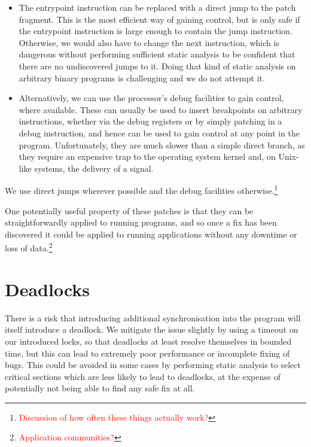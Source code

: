 \documentclass[10pt,twocolumn,preprint,natbib,authoryear]{sigplanconf}
\newcommand{\editorial}[1]{\textcolor{red}{\footnote{\textcolor{red}{#1}}}}
\begin{document}
\begin{itemize}
\item The entrypoint instruction can be replaced with a direct jump to
  the patch fragment.  This is the most efficient way of gaining
  control, but is only safe if the entrypoint instruction is large
  enough to contain the jump instruction.  Otherwise, we would also
  have to change the next instruction, which is dangerous without
  performing sufficient static analysis to be confident that there are
  no undiscovered jumps to it.  Doing that kind of static analysis on
  arbitrary binary programs is challenging and we do not attempt it.

\item Alternatively, we can use the processor's debug facilities to
  gain control, where available.  These can usually be used to insert
  breakpoints on arbitrary instructions, whether via the debug
  registers\cite{DebugRegisters} or by simply patching in a debug
  instruction, and hence can be used to gain control at any point in
  the program.  Unfortunately, they are much slower than a simple
  direct branch, as they require an expensive trap to the operating
  system kernel and, on Unix-like systems, the delivery of a signal.
\end{itemize}

We use direct jumps wherever possible and the debug facilities
otherwise.\editorial{Discussion of how often these things actually
  work?}

One potentially useful property of these patches is that they can be
straightforwardly applied to running programs, and so once a fix has
been discovered it could be applied to running applications without
any downtime or loss of data.\editorial{Application communities?}

\section{Deadlocks}
\label{sect:deadlocks}

There is a risk that introducing additional synchronisation into the
program will itself introduce a deadlock.  We mitigate the issue
slightly by using a timeout on our introduced locks, so that deadlocks
at least resolve themselves in bounded time, but this can lead to
extremely poor performance or incomplete fixing of bugs.  This could
be avoided in some cases by performing static analysis to select
critical sections which are less likely to lead to deadlocks, at the
expense of potentially not being able to find any safe fix at all.
\end{document}
